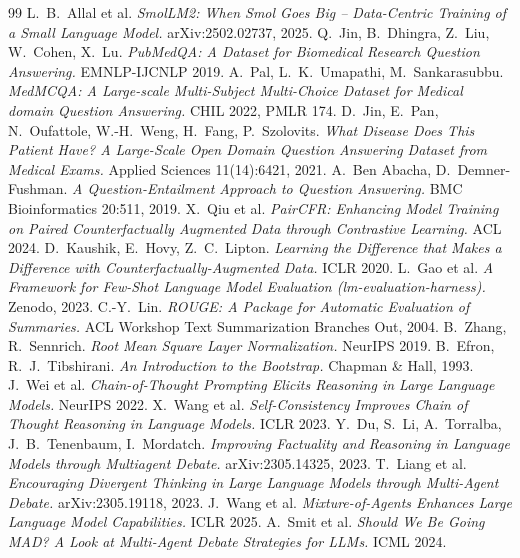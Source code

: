 \documentclass[a4paper,11pt,parskip=half]{scrartcl}
\begin{document}
\begin{thebibliography}{99}\small
{} L.~B.~Allal et al. \emph{SmolLM2: When Smol Goes Big -- Data-Centric Training of a Small Language Model.} arXiv:2502.02737, 2025.
 Q.~Jin, B.~Dhingra, Z.~Liu, W.~Cohen, X.~Lu. \emph{PubMedQA: A Dataset for Biomedical Research Question Answering.} EMNLP-IJCNLP 2019.
 A.~Pal, L.~K.~Umapathi, M.~Sankarasubbu. \emph{MedMCQA: A Large-scale Multi-Subject Multi-Choice Dataset for Medical domain Question Answering.} CHIL 2022, PMLR 174.
 D.~Jin, E.~Pan, N.~Oufattole, W.-H.~Weng, H.~Fang, P.~Szolovits. \emph{What Disease Does This Patient Have? A Large-Scale Open Domain Question Answering Dataset from Medical Exams.} Applied Sciences 11(14):6421, 2021.
 A.~Ben Abacha, D.~Demner-Fushman. \emph{A Question-Entailment Approach to Question Answering.} BMC Bioinformatics 20:511, 2019.
 X.~Qiu et al. \emph{PairCFR: Enhancing Model Training on Paired Counterfactually Augmented Data through Contrastive Learning.} ACL 2024.
 D.~Kaushik, E.~Hovy, Z.~C.~Lipton. \emph{Learning the Difference that Makes a Difference with Counterfactually-Augmented Data.} ICLR 2020.
 L.~Gao et al. \emph{A Framework for Few-Shot Language Model Evaluation (lm-evaluation-harness).} Zenodo, 2023.
 C.-Y.~Lin. \emph{ROUGE: A Package for Automatic Evaluation of Summaries.} ACL Workshop Text Summarization Branches Out, 2004.
 B.~Zhang, R.~Sennrich. \emph{Root Mean Square Layer Normalization.} NeurIPS 2019.
 B.~Efron, R.~J.~Tibshirani. \emph{An Introduction to the Bootstrap.} Chapman \& Hall, 1993.
 J.~Wei et al. \emph{Chain-of-Thought Prompting Elicits Reasoning in Large Language Models.} NeurIPS 2022.
 X.~Wang et al. \emph{Self-Consistency Improves Chain of Thought Reasoning in Language Models.} ICLR 2023.
 Y.~Du, S.~Li, A.~Torralba, J.~B.~Tenenbaum, I.~Mordatch. \emph{Improving Factuality and Reasoning in Language Models through Multiagent Debate.} arXiv:2305.14325, 2023.
 T.~Liang et al. \emph{Encouraging Divergent Thinking in Large Language Models through Multi-Agent Debate.} arXiv:2305.19118, 2023.
 J.~Wang et al. \emph{Mixture-of-Agents Enhances Large Language Model Capabilities.} ICLR 2025.
 A.~Smit et al. \emph{Should We Be Going MAD? A Look at Multi-Agent Debate Strategies for LLMs.} ICML 2024.

\end{thebibliography}
\end{document}
